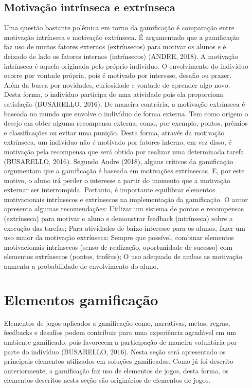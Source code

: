 \documentclass[
	12pt,				%
	oneside,			%
	a4paper,			%
	english,			%
	french,				%
	spanish,			%
	brazil,				%
	]{abntex2}
\begin{document}
\subsection{Motivação intrínseca e extrínseca}

Uma questão bastante polêmica em torno da gamificação é comparação entre motivação intrínseca e motivação extrínseca. É argumentado que a gamificação faz uso de muitos fatores externos (extrínsecos) para motivar os alunos e é deixado de lado os fatores internos (intrínsecos) (ANDRE, 2018).
A motivação intrínseca é aquela originada pelo próprio indivíduo. O envolvimento do indivíduo ocorre por vontade própria,  pois é motivado por interesse, desafio ou prazer. Além da busca por novidades, curiosidade e vontade de aprender algo novo. Desta forma, o indivíduo participa de uma atividade pois ela proporciona satisfação (BUSARELLO, 2016).
De maneira contrária, a motivação extrínseca é baseada no mundo que envolve o indivíduo de forma externa. Tem como origem o desejo em obter alguma recompensa externa, como, por exemplo, pontos, prêmios e classificações ou evitar uma punição. Desta forma, através da motivação extrínseca, um indivíduo não é motivado por fatores interno, em vez disso, é motivação pela recompensa que será obtida por realizar uma determinada tarefa (BUSARELLO, 2016).
Segundo Andre (2018), alguns críticos da gamificação argumentam que a gamificação é baseada em motivações extrínsecas. E, por este motivo, o aluno irá perder o interesse a partir do momento que a motivação externar ser interrompida. Portanto, é importante equilibrar elementos motivacionais intrínsecos e extrínsecos na implementação da gamificação. O autor apresenta algumas recomendações:
Utilizar um sistema de pontos e recompensas (extrínseca) para motivar o aluno e demonstrar feedback (intrínseca) sobre a execução das tarefas;
Para atividades de baixo interesse para os alunos, fazer um uso maior da motivação extrínseca;
Sempre que possível, combinar elementos motivacionais intrínsecos (senso de realização, oportunidade de sucesso) com elementos extrínsecos (pontos, troféus);
O uso adequado de ambas as motivação aumenta a probabilidade de envolvimento do aluno.
  
\section{Elementos gamificação}

	Elementos de jogos aplicados a gamificação como, narrativas, metas, regras, feedbacks e desafíos podem contribuir para uma experiência agradável em um ambiente gamificado, pois favorecem a participação de maneira voluntária por parte do indivíduo (BUSARELLO, 2016).
	Nesta seção será apresentado os principais elementos utilizados em soluções gamificadas. Como já foi descrito anteriormente, a gamificação faz uso de elementos de jogos, desta forma, os elementos descritos nesta seção são originários de elementos de jogos.
\end{document}

